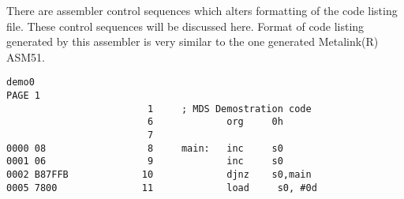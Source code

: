                 There are assembler control sequences which alters formatting of the code listing file. These control sequences will be discussed here.
                Format of code listing generated by this assembler is very similar to the one generated Metalink(R) ASM51.
                \begin{code}[h]
                        \mysmallfont{}
                        \verb'demo0                                                                                                                   '{\color{highlight_macro}\verb'PAGE'}\verb' '{\color{highlight_unknown_base}\verb'1'}\\
                        {\color{highlight_lst_line}\verb'                         1'}\verb'     '{\color{highlight_comment}\verb'; MDS Demostration code'}\\
                        {\color{highlight_lst_line}\verb'                         6'}\verb'             '{\color{highlight_directive}\verb'org'}\verb'     '{\color{highlight_hex}\verb'0h'}\\
                        {\color{highlight_lst_line}\verb'                         7'}\\
                        {\color{highlight_lst_address}\verb'0000'}{\color{highlight_lst_code}\verb' 08'}{\color{highlight_lst_line}\verb'                  8'}\verb'     '{\color{highlight_label}\verb'main:'}\verb'   '{\color{highlight_instruction}\verb'inc'}\verb'     '{\color{highlight_sfr}\verb's0'}\\
                        {\color{highlight_lst_address}\verb'0001'}{\color{highlight_lst_code}\verb' 06'}{\color{highlight_lst_line}\verb'                  9'}\verb'             '{\color{highlight_instruction}\verb'inc'}\verb'     '{\color{highlight_indirect}\verb's0'}\\
                        {\color{highlight_lst_address}\verb'0002'}{\color{highlight_lst_code}\verb' B87FFB'}{\color{highlight_lst_line}\verb'             10'}\verb'             '{\color{highlight_instruction}\verb'djnz'}\verb'    '{\color{highlight_sfr}\verb's0'}{\color{highlight_oper_sep}\verb','}{\color{highlight_constant}\verb'main'}\\
                        {\color{highlight_lst_address}\verb'0005'}{\color{highlight_lst_code}\verb' 7800'}{\color{highlight_lst_line}\verb'               11'}\verb'             '{\color{highlight_instruction}\verb'load'}\verb'     '{\color{highlight_sfr}\verb's0'}{\color{highlight_oper_sep}\verb','}\verb' '{\color{highlight_imm_dec}\verb'#0d'}\\

\end{code}
